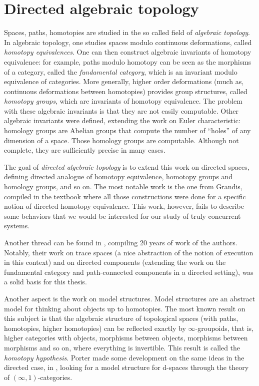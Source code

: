 \section*{Directed algebraic topology}

Spaces, paths, homotopies are studied in the so called field of \emph{algebraic topology}. In algebraic topology, one studies spaces modulo continuous deformations, called \emph{homotopy equivalences}. One can then construct algebraic invariants of homotopy equivalence: for example, paths modulo homotopy can be seen as the morphisms of a category, called the \emph{fundamental category}, which is an invariant modulo equivalence of categories. More generally, higher order deformations (much as, continuous deformations between homotopies) provides group structures, called \emph{homotopy groups}, which are invariants of homotopy equivalence. The problem with these algebraic invariants is that they are not easily computable. Other algebraic invariants were defined, extending the work on Euler characteristic: homology groups are Abelian groups that compute the number of ``holes'' of any dimension of a space. Those homology groups are computable. Although not complete, they are sufficiently precise in many cases.

The goal of \emph{directed algebraic topology} is to extend this work on directed spaces, defining directed analogue of homotopy equivalence, homotopy groups and homology groups, and so on. The most notable work is the one from Grandis, compiled in the textbook \cite{grandis09} where all those constructions were done for a specific notion of directed homotopy equivalence. This work, however, fails to describe some behaviors that we would be interested for our study of truly concurrent systems. 

Another thread can be found in \cite{fajstrup16}, compiling 20 years of work of the authors. Notably, their work on trace spaces (a nice abstraction of the notion of execution in this context) and on directed components (extending the work on the fundamental category and path-connected components in a directed setting), was a solid basis for this thesis. 

Another aspect is the work on model structures. Model structures are an abstract model for thinking about objects up to homotopies. The most known result on this subject \cite{nlabhh} is that the algebraic structure of topological spaces (with paths, homotopies, higher homotopies) can be reflected exactly by $\infty$-groupoids, that is, higher categories with objects, morphisms between objects, morphisms between morphisms and so on, where everything is invertible. This result is called the \emph{homotopy hypothesis}. Porter made some development on the same ideas in the directed case, in \cite{porter08,porter15}, looking for a model structure for d-spaces through the theory of $(\infty,1)$-categories.


